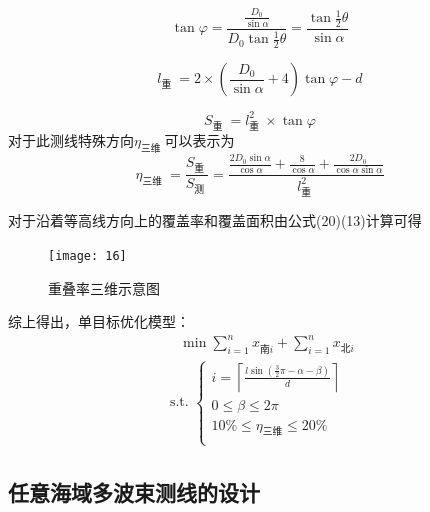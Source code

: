 \documentclass[11pt,twoside,a4paper]{article}
\begin{document}
\begin{equation}
	\tan \varphi=\frac{\frac{D_0}{\sin \alpha}}{D_0 \tan \frac{1}{2} \theta}=\frac{\tan \frac{1}{2} \theta}{\sin \alpha}
\end{equation}

\begin{equation}
	l_{\text {重 }}=2 \times\left(\frac{D_0}{\sin \alpha}+4\right) \tan \varphi-d
\end{equation}

\begin{equation}
	S_{\text {重 }}=l_{\text {重 }}^2 \times \tan \varphi
\end{equation}
对于此测线特殊方向$\eta_{\text {三维 }}$可以表示为
\begin{equation}
	\eta_{\text {三维 }}=\frac{S_{\text {重 }}}{S_{\text {测 }}}=\frac{\frac{2 D_0 \sin \alpha}{\cos \alpha}+\frac{8}{\cos \alpha}+\frac{2 D_0}{\cos \alpha \sin \alpha}}{l_{\text {重 }}^2}
\end{equation}

对于沿着等高线方向上的覆盖率和覆盖面积由公式(20)(13)计算可得


\begin{figure}[h]
	\centering
	\texttt{[image: 16]}
	\caption{重叠率三维示意图}
\end{figure}











综上得出，单目标优化模型：
\begin{gather}
	\quad \min\sum_{i=1}^{n} x_{\text{南}i}+\sum_{i=1}^{n} x_{\text{北}i} \\
	\text { s.t. }\left\{\begin{array}{l}
		 i=\left\lceil\frac{l \sin \left(\frac{3}{2} \pi-\alpha-\beta\right)}{d}\right\rceil \\
		0 \leq \beta \leq 2 \pi\\
		    10\% \leq \eta_\text{三维} \leq 20\%                    \\	
	\end{array}\right.
\end{gather}
  
  

\subsection{任意海域多波束测线的设计}
\end{document}
